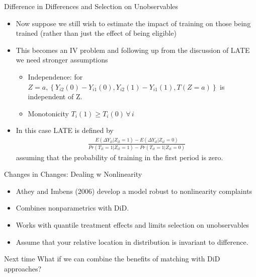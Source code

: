 \documentclass[xcolor=pdftex,dvipsnames,table,mathserif,aspectratio=169]{beamer}
\begin{document}
\begin{frame}{Difference in Differences and Selection on Unobservables}
\begin{itemize}
\item Now suppose we still wish to estimate the impact of training on those being trained (rather than just the effect of being eligible)
\item This becomes an IV problem and following up from the discussion of LATE we need stronger assumptions
\begin{itemize}
\item  Independence: for $Z = a, \left\{Y_{i2}(0) - Y_{i1}(0), Y_{i2}(1) - Y_{i1}(1), T(Z=a)\right\}$ is independent of Z.
\item Monotonicity $T_i(1) \ge T_i(0) \, \forall \, i$
\end{itemize}
\item In this case LATE is defined by
\begin{align*}
\frac{E(\Delta Y_{it} | Z_{it} = 1) - E(\Delta Y_{it} | Z_{it} = 0)}{ Pr(T_{it}= 1| Z_{it}=1) - Pr(T_{it} = 1 | Z_{it} =0)}
\end{align*}
assuming that the probability of training in the first period is zero.
\end{itemize}              
\end{frame}

\begin{frame}{Changes in Changes: Dealing w Nonlinearity}
\begin{itemize}
\item Athey and Imbens (2006) develop a model robust to nonlinearity complaints
\item Combines nonparametrics with DiD.
\item Works with \alert{quantile treatment effects} and limits selection on unobservables
\item Assume that your relative location in distribution is invariant to difference.
\end{itemize}
\end{frame}

\begin{frame}{Next time}
What if we can combine the benefits of matching with DiD approaches?
\end{frame}
\end{document}
